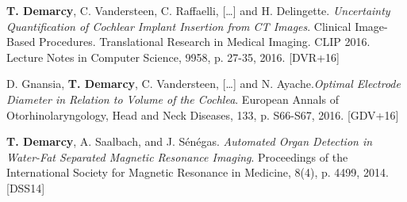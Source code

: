 \begin{cvhonors}

  \cvhonor
    {\textbf{T. Demarcy}, C. Vandersteen, C. Raffaelli, [\ldots] and H. Delingette. \textit{Uncertainty Quantification of Cochlear Implant Insertion from CT Images}. Clinical Image-Based Procedures. Translational Research in Medical Imaging. CLIP 2016. Lecture Notes in Computer Science, 9958, p. 27-35, 2016.} %
    {\hypertarget{DVR+16}{[DVR+16]}} %
    
  \cvhonor
    {D. Gnansia, \textbf{T. Demarcy},  C.  Vandersteen,  [\ldots]  and  N.  Ayache.\textit{Optimal  Electrode  Diameter  in  Relation  to  Volume  of  the  Cochlea}. European Annals of Otorhinolaryngology, Head and Neck Diseases, 133, p. S66-S67, 2016.} %
    {\hypertarget{GDV+16}{[GDV+16]}} %
    
  \cvhonor
    {\textbf{T. Demarcy}, A. Saalbach, and J. Sénégas. \textit{Automated Organ Detection in Water-Fat Separated Magnetic Resonance Imaging}. Proceedings of the International Society for Magnetic Resonance in Medicine, 8(4), p. 4499, 2014.} %
    {\hypertarget{DSS14}{[DSS14]}} %
    
\end{cvhonors}



